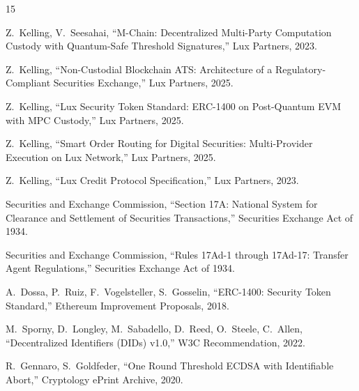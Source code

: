 \documentclass[11pt,a4paper]{article}
\begin{document}
\begin{thebibliography}{15}

Z.~Kelling, V.~Seesahai,
``M-Chain: Decentralized Multi-Party Computation Custody with Quantum-Safe Threshold Signatures,''
Lux Partners, 2023.

Z.~Kelling,
``Non-Custodial Blockchain ATS: Architecture of a Regulatory-Compliant Securities Exchange,''
Lux Partners, 2025.

Z.~Kelling,
``Lux Security Token Standard: ERC-1400 on Post-Quantum EVM with MPC Custody,''
Lux Partners, 2025.

Z.~Kelling,
``Smart Order Routing for Digital Securities: Multi-Provider Execution on Lux Network,''
Lux Partners, 2025.

Z.~Kelling,
``Lux Credit Protocol Specification,''
Lux Partners, 2023.

Securities and Exchange Commission,
``Section 17A: National System for Clearance and Settlement of Securities Transactions,''
Securities Exchange Act of 1934.

Securities and Exchange Commission,
``Rules 17Ad-1 through 17Ad-17: Transfer Agent Regulations,''
Securities Exchange Act of 1934.

A.~Dossa, P.~Ruiz, F.~Vogelsteller, S.~Gosselin,
``ERC-1400: Security Token Standard,''
Ethereum Improvement Proposals, 2018.

M.~Sporny, D.~Longley, M.~Sabadello, D.~Reed, O.~Steele, C.~Allen,
``Decentralized Identifiers (DIDs) v1.0,''
W3C Recommendation, 2022.

R.~Gennaro, S.~Goldfeder,
``One Round Threshold ECDSA with Identifiable Abort,''
Cryptology ePrint Archive, 2020.

\end{thebibliography}
\end{document}
